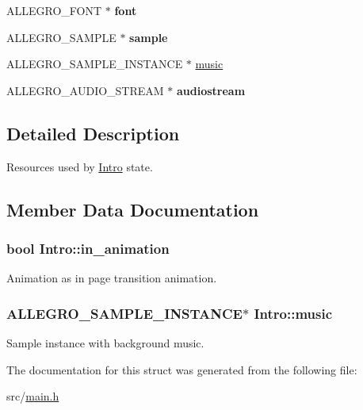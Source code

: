 \begin{DoxyCompactItemize}
\item 
\hypertarget{structIntro_a896d4fdd74cf47535173eeaa6e81f734}{\-A\-L\-L\-E\-G\-R\-O\-\_\-\-F\-O\-N\-T $\ast$ {\bfseries font}}\label{structIntro_a896d4fdd74cf47535173eeaa6e81f734}

\item 
\hypertarget{structIntro_a0189475d44f8e19e6fe543371a9daedb}{\-A\-L\-L\-E\-G\-R\-O\-\_\-\-S\-A\-M\-P\-L\-E $\ast$ {\bfseries sample}}\label{structIntro_a0189475d44f8e19e6fe543371a9daedb}

\item 
\-A\-L\-L\-E\-G\-R\-O\-\_\-\-S\-A\-M\-P\-L\-E\-\_\-\-I\-N\-S\-T\-A\-N\-C\-E $\ast$ \hyperlink{structIntro_a461ce3f44fd4f7d2d3713e2f31c1d1ec}{music}
\item 
\hypertarget{structIntro_a879aa48597b2f7b6fbeb9f9911234350}{\-A\-L\-L\-E\-G\-R\-O\-\_\-\-A\-U\-D\-I\-O\-\_\-\-S\-T\-R\-E\-A\-M $\ast$ {\bfseries audiostream}}\label{structIntro_a879aa48597b2f7b6fbeb9f9911234350}

\end{DoxyCompactItemize}


\subsection{\-Detailed \-Description}
\-Resources used by \hyperlink{structIntro}{\-Intro} state. 

\subsection{\-Member \-Data \-Documentation}
\hypertarget{structIntro_a2876fd8a7bfd940c3936eb6445984a22}{
\subsubsection[{in\-\_\-animation}]{\setlength{\rightskip}{0pt plus 5cm}bool {\bf \-Intro\-::in\-\_\-animation}}}\label{structIntro_a2876fd8a7bfd940c3936eb6445984a22}
\-Animation as in page transition animation. \hypertarget{structIntro_a461ce3f44fd4f7d2d3713e2f31c1d1ec}{
\subsubsection[{music}]{\setlength{\rightskip}{0pt plus 5cm}\-A\-L\-L\-E\-G\-R\-O\-\_\-\-S\-A\-M\-P\-L\-E\-\_\-\-I\-N\-S\-T\-A\-N\-C\-E$\ast$ {\bf \-Intro\-::music}}}\label{structIntro_a461ce3f44fd4f7d2d3713e2f31c1d1ec}
\-Sample instance with background music. 

\-The documentation for this struct was generated from the following file\-:\begin{DoxyCompactItemize}
\item 
src/\hyperlink{main_8h}{main.\-h}\end{DoxyCompactItemize}
